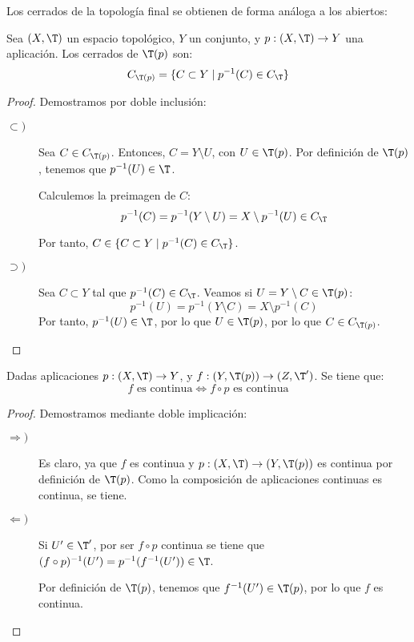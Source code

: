 Los cerrados de la topología final se obtienen de forma análoga a los abiertos:
\begin{lema}
    Sea $(X,\T)$ un espacio topológico, $Y$ un conjunto, y $p:(X,\T)\to Y$ una aplicación. Los cerrados de $\T(p)$ son:
    $$C_{\T(p)}=\{C\subset Y\mid p^{-1}(C)\in C_\T\}$$
\end{lema}
\begin{proof}
    Demostramos por doble inclusión:
    \begin{description}
        \item[$\subset)$] Sea $C\in C_{\T(p)}$. Entonces, $C=Y\setminus U$, con $U\in \T(p)$. Por definición de $\T(p)$, tenemos que $p^{-1}(U)\in \T$.

        Calculemos la preimagen de $C$:
        \begin{equation*}
            p^{-1}(C) = p^{-1}(Y\setminus U) = X\setminus p^{-1}(U)\in C_\T
        \end{equation*}

        Por tanto, $C\in \{C\subset Y\mid p^{-1}(C)\in C_\T\}$.

        \item[$\supset)$] Sea $C\subset Y$ tal que $p^{-1}(C)\in C_\T$. Veamos si $U=Y\setminus C\in \T(p)$:
        \begin{equation*}
            p^{-1}(U)=p^{-1}(Y\setminus C) = X\setminus p^{-1}(C)
        \end{equation*}
        Por tanto, $p^{-1}(U)\in \T$, por lo que $U\in \T(p)$, por lo que $C\in C_{\T(p)}$.
    \end{description}
\end{proof}

\begin{prop}
    Dadas aplicaciones $p:(X,\T)\to Y$, y $f:(Y,\T(p))\to (Z,\T')$. Se tiene que:
    \begin{equation*}
        f \text{ es continua} \Longleftrightarrow
        f\circ p \text{ es continua}
    \end{equation*}
\end{prop}
\begin{proof}
    Demostramos mediante doble implicación:
    \begin{description}
        \item[$\Longrightarrow)$] Es claro, ya que $f$ es continua y $p:(X,\T)\to (Y,\T(p))$ es continua por definición de $\T(p)$. Como la composición de aplicaciones continuas es continua, se tiene.

        \item[$\Longleftarrow)$] Si $U'\in \T'$, por ser $f\circ p$ continua se tiene que $(f\circ p)^{-1}(U')=p^{-1}(f^{-1}(U'))\in \T$.

        Por definición de $\T(p)$, tenemos que $f^{-1}(U')\in \T(p)$, por lo que $f$ es continua.
    \end{description}
\end{proof}

